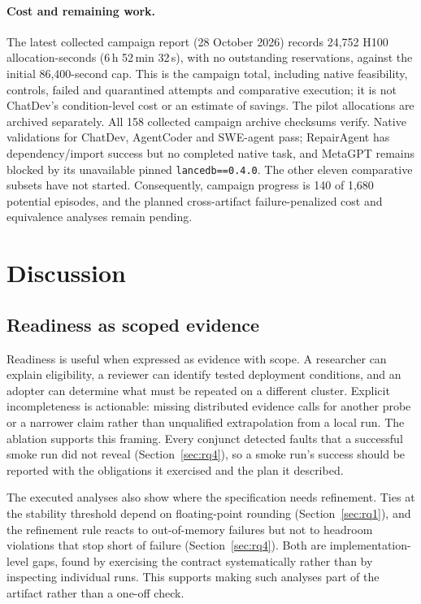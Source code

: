 \documentclass[pdflatex,sn-mathphys-num]{sn-jnl}
\theoremstyle{thmstylethree}
\newcommand{\code}[1]{\texttt{#1}}
\begin{document}
\paragraph{Cost and remaining work.} The latest collected campaign report (28 October 2026) records 24,752 H100 allocation-seconds (6\,h 52\,min 32\,s), with no outstanding reservations, against the initial 86,400-second cap. This is the campaign total, including native feasibility, controls, failed and quarantined attempts and comparative execution; it is not ChatDev's condition-level cost or an estimate of savings. The pilot allocations are archived separately. All 158 collected campaign archive checksums verify. Native validations for ChatDev, AgentCoder and SWE-agent pass; RepairAgent has dependency/import success but no completed native task, and MetaGPT remains blocked by its unavailable pinned \code{lancedb==0.4.0}. The other eleven comparative subsets have not started. Consequently, campaign progress is 140 of 1,680 potential episodes, and the planned cross-artifact failure-penalized cost and equivalence analyses remain pending.



\section{Discussion}\label{sec:discussion}
\subsection{Readiness as scoped evidence}
Readiness is useful when expressed as evidence with scope. A researcher can explain eligibility, a reviewer can identify tested deployment conditions, and an adopter can determine what must be repeated on a different cluster. Explicit incompleteness is actionable: missing distributed evidence calls for another probe or a narrower claim rather than unqualified extrapolation from a local run. The ablation supports this framing. Every conjunct detected faults that a successful smoke run did not reveal (Section~\ref{sec:rq4}), so a smoke run's success should be reported with the obligations it exercised and the plan it described.

The executed analyses also show where the specification needs refinement. Ties at the stability threshold depend on floating-point rounding (Section~\ref{sec:rq1}), and the refinement rule reacts to out-of-memory failures but not to headroom violations that stop short of failure (Section~\ref{sec:rq4}). Both are implementation-level gaps, found by exercising the contract systematically rather than by inspecting individual runs. This supports making such analyses part of the artifact rather than a one-off check.
\end{document}
